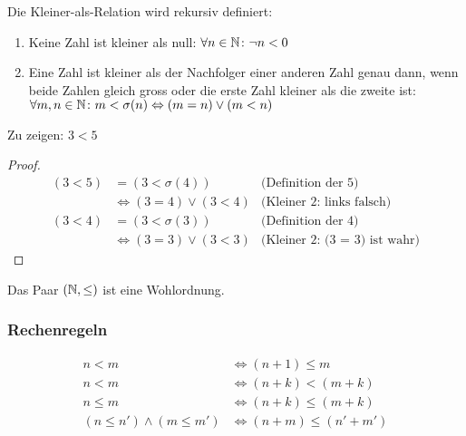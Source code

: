 Die Kleiner-als-Relation wird rekursiv definiert:
\begin{enumerate} 
	\item Keine Zahl ist kleiner als null: $\forall n \in \mathbb{N} \colon \neg n < 0$
	\item Eine Zahl ist kleiner als der Nachfolger einer anderen Zahl genau dann, wenn beide Zahlen gleich gross oder die erste Zahl kleiner als die zweite ist:
		$\forall m, n \in \mathbb{N} \colon m < \sigma(n) \Leftrightarrow (m = n) \vee (m < n)$
\end{enumerate}
Zu zeigen: $3 < 5$
\begin{proof}
	\begin{align*}
		(3 < 5) & = (3 < \sigma(4))				& \mbox{(Definition der 5)}\\
		& \Leftrightarrow (3 = 4) \vee (3 < 4)	& \mbox{(Kleiner 2: links falsch)}\\
		(3 < 4) & = (3 < \sigma(3))				& \mbox{(Definition der 4)}\\
		& \Leftrightarrow (3 = 3) \vee (3 < 3)	& \mbox{(Kleiner 2: (3 = 3) ist wahr)}
	\end{align*}
	\qedhere
\end{proof}

Das Paar $(\mathbb{N}, \leq)$ ist eine Wohlordnung.

\subsubsection{Rechenregeln}
\begin{align*}
	n < m& \Leftrightarrow (n + 1) \leq m\\
	n < m& \Leftrightarrow (n + k) < (m + k)\\
	n \leq m& \Leftrightarrow (n + k) \leq (m + k)\\
	(n \leq n') \wedge (m \leq m')& \Leftrightarrow (n + m) \leq (n' + m')\\
\end{align*}
